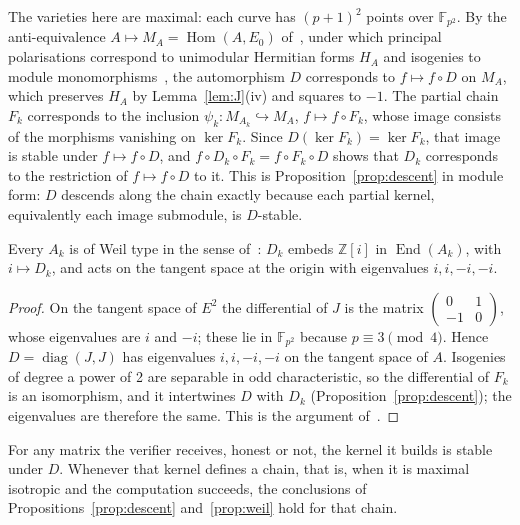 \begin{remark}
\label{rem:module}
The varieties here are maximal: each curve has $(p+1)^2$ points over
$\mathbb{F}_{p^2}$. By the anti-equivalence $A \mapsto M_A =
\operatorname{Hom}(A, E_0)$ of~\cite[Theorem 2.5]{PRS26}, under which
principal polarisations correspond to unimodular Hermitian forms $H_A$ and
isogenies to module monomorphisms~\cite[Table 1]{PRS26}, the automorphism
$D$ corresponds to $f \mapsto f \circ D$ on $M_A$, which preserves $H_A$
by Lemma~\ref{lem:J}(iv) and squares to $-1$. The partial chain $F_k$
corresponds to the inclusion $\psi_k \colon M_{A_k} \hookrightarrow M_A$,
$f \mapsto f \circ F_k$, whose image consists of the morphisms vanishing on
$\ker F_k$. Since $D(\ker F_k) = \ker F_k$, that image is stable under
$f \mapsto f \circ D$, and $f \circ D_k \circ F_k = f \circ F_k \circ D$
shows that $D_k$ corresponds to the restriction of $f \mapsto f \circ D$
to it. This is Proposition~\ref{prop:descent} in module form: $D$
descends along the chain exactly because each partial kernel, equivalently
each image submodule, is $D$-stable.
\end{remark}

\begin{proposition}
    \label{prop:weil}
    Every $A_k$ is of Weil type in the sense of~\cite[Definition 4.1]{BDD+26}:
    $D_k$ embeds $\mathbb{Z}[i]$ in $\operatorname{End}(A_k)$, with
    $i \mapsto D_k$, and acts on the tangent space at the origin with
    eigenvalues $i, i, -i, -i$.
\end{proposition}

\begin{proof}
    On the tangent space of $E^2$ the differential of $J$ is the matrix
    $\left(\begin{smallmatrix} 0 & 1 \\ -1 & 0 \end{smallmatrix}\right)$,
    whose eigenvalues are $i$ and $-i$; these lie in $\mathbb{F}_{p^2}$ because
    $p \equiv 3 \pmod 4$. Hence $D = \operatorname{diag}(J, J)$ has eigenvalues
    $i, i, -i, -i$ on the tangent space of $A$. Isogenies of degree a power of
    2 are separable in odd characteristic, so the differential of $F_k$ is an
    isomorphism, and it intertwines $D$ with $D_k$
    (Proposition~\ref{prop:descent}); the eigenvalues are therefore the same.
    This is the argument of~\cite[proof of Proposition G.1]{BDD+26}.
\end{proof}

\begin{proposition}
    \label{prop:forged}
    For any matrix the verifier receives, honest or not, the kernel it builds
    is stable under $D$. Whenever that kernel defines a chain, that is, when it
    is maximal isotropic and the computation succeeds, the conclusions of
    Propositions~\ref{prop:descent} and~\ref{prop:weil} hold for that chain.
\end{proposition}

